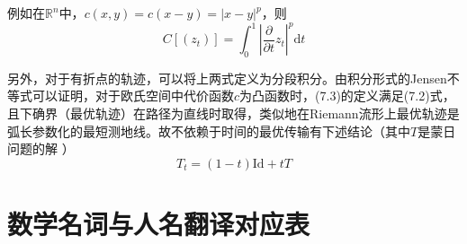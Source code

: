 \documentclass[cn,10pt,math=newtx,citestyle=gb7714-2015,bibstyle=gb7714-2015]{elegantbook}
\begin{document}
例如在$\mathbb{R}^n$中，$c(x,y)=c(x-y)=|x-y|^p$，则
\begin{equation*}
    C[(z_t)]=\int_0^1 \left|\frac{\partial}{\partial t} z_t\right|^p \text{d}t
\end{equation*}

另外，对于有折点的轨迹，可以将上两式定义为分段积分。由积分形式的Jensen不等式可以证明，对于欧氏空间中代价函数$c$为凸函数时，(7.3)的定义满足(7.2)式，且下确界（最优轨迹）在路径为直线时取得，类似地在Riemann流形上最优轨迹是弧长参数化的最短测地线。故不依赖于时间的最优传输有下述结论（其中$T$是蒙日问题的解
）
\begin{equation*}
    T_t=(1-t)\text{Id}+tT
\end{equation*}

\appendix

\chapter{数学名词与人名翻译对应表}
\end{document}
